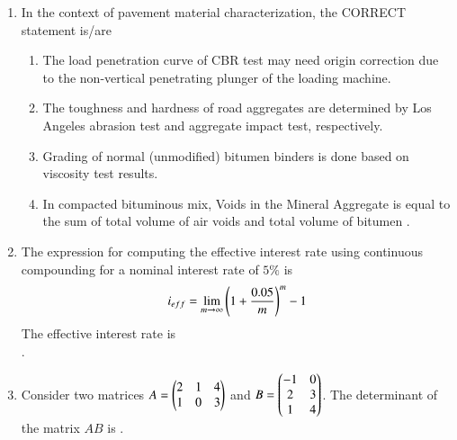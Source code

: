 \documentclass[journal,12pt,onecolumn]{article}
\theoremstyle{remark}
\begin{document}
\begin{enumerate}
    \hfill{}
    \begin{enumerate}
    \end{enumerate}

    \item In the context of pavement material characterization, the CORRECT statement is/are
    \hfill{}
    \begin{enumerate}
        \item The load penetration curve of CBR test may need origin correction due to the
        non-vertical penetrating plunger of the loading machine.
        \item The toughness and hardness of road aggregates are determined by Los Angeles
        abrasion test and aggregate impact test, respectively.
        \item Grading of normal (unmodified) bitumen binders is done based on viscosity test
        results.
        \item In compacted bituminous mix, Voids in the Mineral Aggregate  is equal to
        the sum of total volume of air voids  and total volume of bitumen .
    \end{enumerate}

    \item The expression for computing the effective interest rate  using continuous
    compounding for a nominal interest rate of $5\%$ is
    \begin{align}
    i_{eff} = \lim_{m \to \infty} \left(1 + \frac{0.05}{m}\right)^m - 1
    \end{align}
    The effective interest rate  is \underline{\hspace{2cm}} \\
    .
    
    \hfill{}

    \item Consider two matrices $A = \begin{pmatrix}2 & 1 & 4 \\ 1 & 0 & 3\end{pmatrix}$ and $B = \begin{pmatrix}-1 & 0 \\ 2 & 3 \\ 1 & 4\end{pmatrix}$.
    The determinant of the matrix $AB$ is \underline{\hspace{2cm}} .
    

\end{enumerate}
\end{document}
